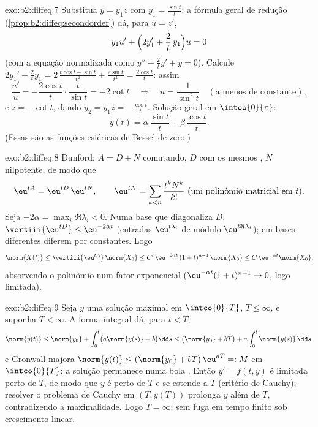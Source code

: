 \begin{solution}{exo:b2:diffeq:7}
Substitua $y = y_1 z$ com $y_1 = \frac{\sin t}{t}$: a fórmula geral de
redução (\cref{prop:b2:diffeq:secondorder}) dá, para $u
= z'$,
\[
y_1 u' + \Bigl(2y_1' + \frac{2}{t}\,y_1\Bigr)u = 0
\]
(com a equação normalizada como $y'' + \frac2t y' + y = 0$). Calcule
$2y_1' + \frac2t y_1 = 2\,\frac{t\cos t - \sin t}{t^2} +
\frac{2\sin t}{t^2} = \frac{2\cos t}{t}$: assim
\[
\frac{u'}{u} = -\frac{2\cos t}{t}\cdot\frac{t}{\sin t}
= -2\cot t
\quad\Longrightarrow\quad
u = \frac{1}{\sin^2 t}
\quad (\text{a menos de constante}),
\]
e $z = -\cot t$, dando $y_2 = y_1 z = -\frac{\cos t}{t}$.
Solução geral em $\intoo{0}{\pi}$:
\[
y(t) = \alpha\,\frac{\sin t}{t} + \beta\,\frac{\cos t}{t} .
\]
(Essas são as funções esféricas de Bessel de  zero.)
\end{solution}

\begin{solution}{exo:b2:diffeq:8}
Dunford: $A = D + N$ comutando, $D$  com os mesmos
, $N$ nilpotente, de modo que
\[
\eu^{tA} = \eu^{tD}\,\eu^{tN},
\qquad
\eu^{tN} = \sum_{k < n} \frac{t^kN^k}{k!}
\ \text{(um polinômio matricial em } t).
\]
Seja $-2\alpha = \max_i \Re\lambda_i < 0$. Numa base que diagonaliza
$D$, $\vertiii{\eu^{tD}} \leq \eu^{-2\alpha t}$ (entradas
$\eu^{t\lambda_i}$ de módulo $\eu^{t\Re\lambda_i}$);  em
bases diferentes diferem por constantes. Logo
\[
\norm{X(t)} \leq \vertiii{\eu^{tA}}\,\norm{X_0}
\leq C'\,\eu^{-2\alpha t}\,(1 + t)^{n-1}\,\norm{X_0}
\leq C\,\eu^{-\alpha t}\norm{X_0} ,
\]
absorvendo o polinômio num fator exponencial
($\eu^{-\alpha t}(1+t)^{n-1} \to 0$, logo limitada).
\end{solution}

\begin{solution}{exo:b2:diffeq:9}
Seja $y$ uma solução maximal em $\intco{0}{T}$, $T \leq \infty$,
e suponha $T < \infty$. A forma integral dá, para $t < T$,
\[
\norm{y(t)} \leq \norm{y_0} + \int_0^t \bigl(a\norm{y(s)} +
b\bigr)\dd s
\leq \bigl(\norm{y_0} + bT\bigr) + a\int_0^t\norm{y(s)}\,\dd s ,
\]
e Gronwall majora $\norm{y(t)} \leq (\norm{y_0} +
bT)\,\eu^{aT} =: M$ em $\intco{0}{T}$: a solução permanece numa
bola . Então $y' = f(t, y)$ é limitada perto de $T$, de modo que $y$ é
 perto de $T$ e se estende  a $T$ (critério
de Cauchy); resolver o problema de Cauchy em $(T, y(T))$ prolonga $y$
além de $T$, contradizendo a maximalidade. Logo $T = \infty$: sem
fuga em tempo finito sob crescimento linear.
\end{solution}

